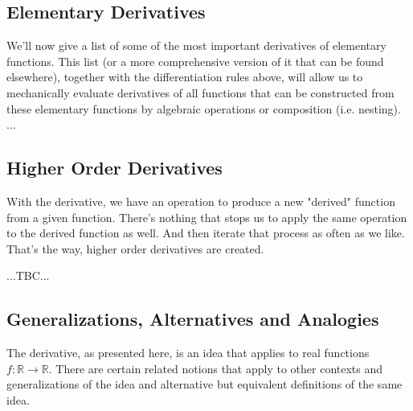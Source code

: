 







\subsection{Elementary Derivatives}
We'll now give a list of some of the most important derivatives of elementary functions. This list (or a more comprehensive version of it that can be found elsewhere), together with the differentiation rules above, will allow us to mechanically evaluate derivatives of all functions that can be constructed from these elementary functions by algebraic operations or composition (i.e. nesting).
...


\subsection{Higher Order Derivatives}
With the derivative, we have an operation to produce a new "derived" function from a given function. There's nothing that stops us to apply the same operation to the derived function as well. And then iterate that process as often as we like. That's the way, higher order derivatives are created.

...TBC...





\subsection{Generalizations, Alternatives and Analogies}
The derivative, as presented here, is an idea that applies to real functions $f: \mathbb{R} \rightarrow \mathbb{R}$. There are certain related notions that apply to other contexts and generalizations of the idea and alternative but equivalent definitions of the same idea.


